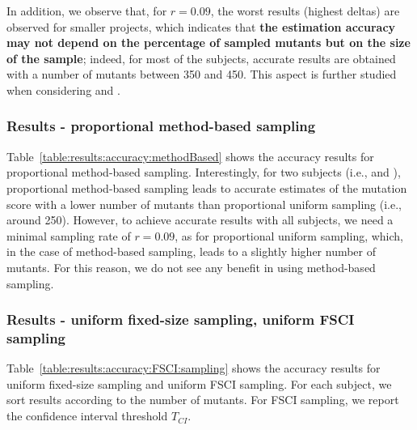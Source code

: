 

In addition, we observe that, for $r=0.09$, the worst results (highest deltas) are observed for smaller projects, which indicates that \textbf{the estimation accuracy may not depend on the percentage of sampled mutants but on the size of the sample}; indeed, for most of the subjects, accurate results  are obtained with a number of mutants between 350 and 450. This aspect is further studied when considering   and .

\subsubsection{Results - proportional method-based sampling}

Table~\ref{table:results:accuracy:methodBased} shows the accuracy results for proportional method-based sampling.
Interestingly, for two subjects (i.e., \GCSP{} and \UTIL{}), proportional method-based sampling leads to accurate estimates of the mutation score with a lower number of mutants than proportional uniform sampling (i.e., around 250).
However, to achieve accurate results with all subjects, we need a minimal sampling rate of $r=0.09$, as for proportional uniform sampling, which, in the case of method-based sampling, leads to a slightly higher number of mutants. For this reason, we do not see any benefit in using method-based sampling.




\subsubsection{Results - uniform fixed-size sampling, uniform FSCI sampling}



Table~\ref{table:results:accuracy:FSCI:sampling} shows the accuracy results for uniform fixed-size sampling and uniform FSCI sampling. For each subject, we sort results according to the number of mutants. For FSCI sampling, we report the confidence interval threshold $T_\mathit{CI}$.

